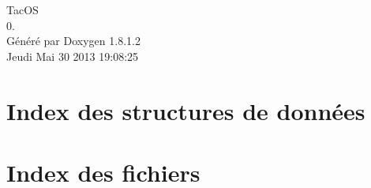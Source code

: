 \documentclass{book}
\begin{document}
\hypersetup{pageanchor=false,citecolor=blue}
\begin{titlepage}
\vspace*{7cm}
\begin{center}
{\Large Tac\-O\-S \\[1ex]\large 0. }\\
\vspace*{1cm}
{\large Généré par Doxygen 1.8.1.2}\\
\vspace*{0.5cm}
{\small Jeudi Mai 30 2013 19:08:25}\\
\end{center}
\end{titlepage}
\clearemptydoublepage
{}
\tableofcontents
\clearemptydoublepage
{}
\hypersetup{pageanchor=true,citecolor=blue}
\chapter{Index des structures de données}

\chapter{Index des fichiers}

\end{document}
